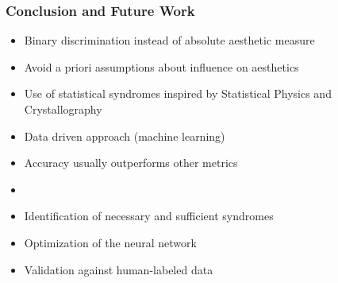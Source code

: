 \documentclass{beamer}
\begin{document}
\begin{frame}
  \frametitle{Conclusion and Future Work}
  \begin{itemize}
  \item Binary discrimination instead of absolute aesthetic measure
  \item Avoid a priori assumptions about influence on aesthetics
  \item Use of statistical syndromes inspired by Statistical Physics and Crystallography
  \item Data driven approach (machine learning)
  \item Accuracy usually outperforms other metrics
  \item {}
  \end{itemize}
  \par\bigskip
  \begin{itemize}
  \item Identification of necessary and sufficient syndromes
  \item Optimization of the neural network
  \item Validation against human-labeled data
  \end{itemize}
\end{frame}

\section*{\bibname}

\ResetBibliographyStyle
\begin{frame}
  \frametitle{\bibname}
  \printbibliography
\end{frame}
\end{document}
